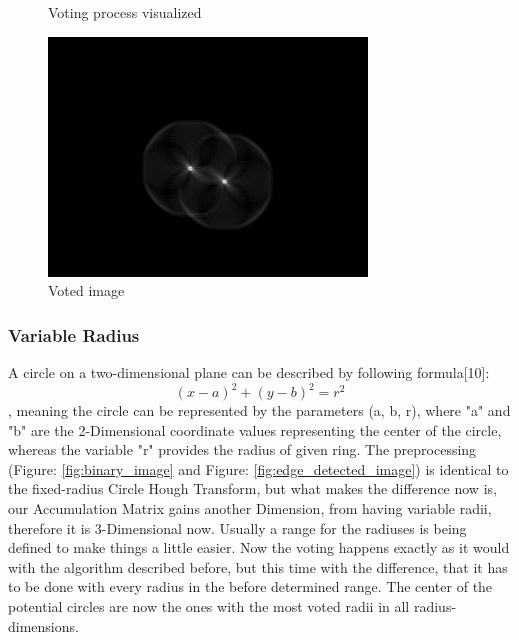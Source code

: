 \begin{figure}[H]
	\caption{Voting process visualized\protect\footnotemark}\label{fig:circlehough_explanation}
	\endminipage
	\hfill
	\includegraphics[width=\linewidth]{images/hough_circle.jpg}
	\caption{Voted image\protect\footnotemark}\label{fig:voted_image}
	\endminipage
	
\end{figure}
\setcounter{footnote}{2}
\setcounter{footnote}{3}
\setcounter{footnote}{4}
\setcounter{footnote}{5}

\subsubsection{Variable Radius}
A circle on a two-dimensional plane can be described by following formula[10]: \[ (x - a)^2 + (y - b)^2 = r^2  \]
, meaning the circle can be represented by the parameters (a, b, r), where "a" and "b" are the 2-Dimensional coordinate values representing the center of the circle, whereas the variable "r" provides the radius of given ring. \newline
The preprocessing (Figure: \ref{fig:binary_image} and Figure: \ref{fig:edge_detected_image}) is identical to the fixed-radius Circle Hough Transform, but what makes the difference now is, our Accumulation Matrix gains another Dimension, from having variable radii, therefore it is 3-Dimensional now. Usually a range for the radiuses is being defined to make things a little easier. Now the voting happens exactly as it would with the algorithm described before, but this time with the difference, that it has to be done with every radius in the before determined range. The center of the potential circles are now the ones with the most voted radii in all radius-dimensions.

